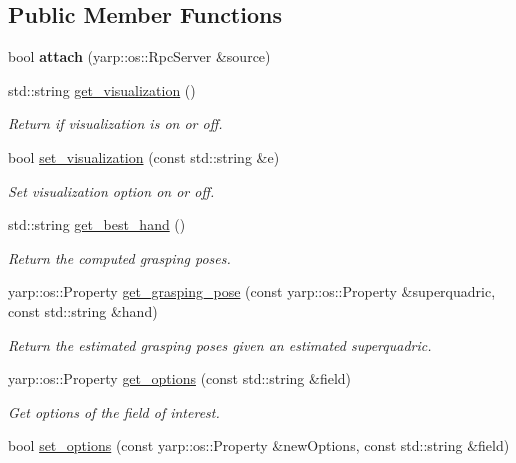 \subsection*{Public Member Functions}
\begin{DoxyCompactItemize}
\item 
bool {\bfseries attach} (yarp\+::os\+::\+Rpc\+Server \&source)\label{classGraspingModule_ac3e7a265105f99952742a6aca17d67c3}

\item 
std\+::string \hyperlink{classGraspingModule_aabedec650875263d27ecf20fa9dd8b39}{get\+\_\+visualization} ()
\begin{DoxyCompactList}\small\item\em Return if visualization is on or off. \end{DoxyCompactList}\item 
bool \hyperlink{classGraspingModule_a801de4b63aba360a4b85e322c5947a4a}{set\+\_\+visualization} (const std\+::string \&e)
\begin{DoxyCompactList}\small\item\em Set visualization option on or off. \end{DoxyCompactList}\item 
std\+::string \hyperlink{classGraspingModule_a5103f8bd6671a11a9bd1c7e29d290009}{get\+\_\+best\+\_\+hand} ()
\begin{DoxyCompactList}\small\item\em Return the computed grasping poses. \end{DoxyCompactList}\item 
yarp\+::os\+::\+Property \hyperlink{classGraspingModule_af1e057f767ab83be185cf486d3f5c46b}{get\+\_\+grasping\+\_\+pose} (const yarp\+::os\+::\+Property \&superquadric, const std\+::string \&hand)
\begin{DoxyCompactList}\small\item\em Return the estimated grasping poses given an estimated superquadric. \end{DoxyCompactList}\item 
yarp\+::os\+::\+Property \hyperlink{classGraspingModule_a375475691c644d8aa882db8d65ceda50}{get\+\_\+options} (const std\+::string \&field)
\begin{DoxyCompactList}\small\item\em Get options of the field of interest. \end{DoxyCompactList}\item 
bool \hyperlink{classGraspingModule_a849c459ef9700c93b45ef6cff394f675}{set\+\_\+options} (const yarp\+::os\+::\+Property \&new\+Options, const std\+::string \&field)

\end{DoxyCompactItemize}
